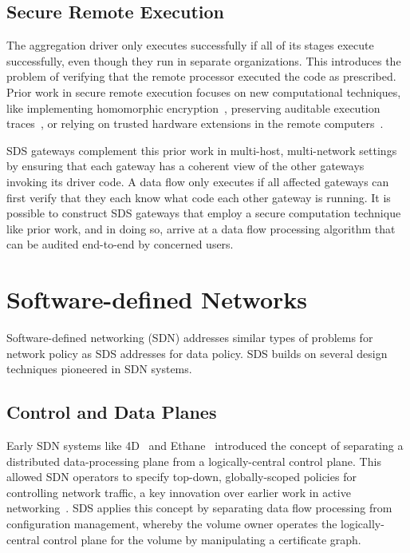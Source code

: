 \subsection{Secure Remote Execution}

The aggregation driver only executes successfully if all of its stages
execute successfully, even though they run in separate organizations.  This
introduces the problem of verifying that the remote processor executed the code
as prescribed.  Prior work in secure remote execution focuses on new
computational techniques, like implementing
homomorphic encryption~\cite{homomorphic-encryption}, preserving auditable
execution traces~\cite{truebit}, or relying on trusted hardware extensions in
the remote computers~\cite{intel-sgx}.

SDS gateways complement this prior work in multi-host, multi-network settings by
ensuring that each gateway has a coherent view of the other gateways invoking
its driver code.  A data flow only executes if all affected gateways can first
verify that they each know what code each other gateway is running.  It is
possible to construct SDS gateways that employ a secure computation technique
like prior work, and in doing so, arrive at a data flow processing algorithm
that can be audited end-to-end by concerned users.

\section{Software-defined Networks}

Software-defined networking (SDN) addresses similar types of problems for
network policy as SDS addresses for data policy.  SDS builds on several design
techniques pioneered in SDN systems.

\subsection{Control and Data Planes}

Early SDN systems like
4D~\cite{4D} and Ethane~\cite{ethane} introduced the concept of separating a
distributed data-processing plane from a logically-central control plane.
This allowed SDN operators to specify top-down, globally-scoped policies for controlling
network traffic, a key innovation over earlier work in active
networking~\cite{sdnhistory}.  SDS applies this concept by
separating data flow processing from configuration management, whereby the
volume owner operates the logically-central control plane for the
volume by manipulating a certificate graph.

